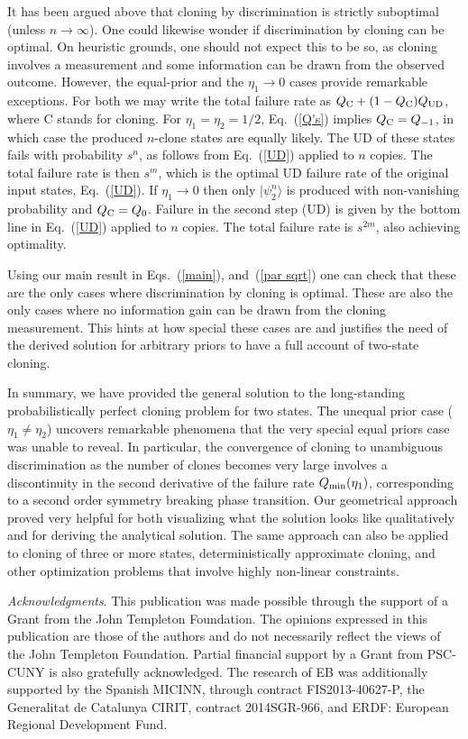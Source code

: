 \documentclass[aps,prl,twocolumn,showpacs]{revtex4}
\begin{document}
It has been argued above that cloning by discrimination is strictly suboptimal (unless $n\to \infty$).
One could likewise wonder if discrimination by cloning can be optimal. On heuristic grounds, one should not expect this to be so, as cloning involves a measurement and some information can be drawn from the observed outcome. However, the equal-prior and the $\eta_1\to 0$ cases provide remarkable exceptions. For both we may write the total failure rate as $Q_{\rm C} + (1-Q_{\rm C})Q_{\rm UD}$, where C stands for cloning. For $\eta_1 = \eta_2= 1/2$, Eq.~(\ref{Q's}) implies $Q_{\rm C}=Q_{-1}$, in which case the produced $n$-clone states are equally likely. The UD of these states fails with probability $s^{n}$, as follows from Eq.~(\ref{UD}) applied to $n$ copies. The total failure rate is then $s^m$, which is the optimal UD failure rate of the original input states, Eq.~(\ref{UD}). If $\eta_1\to 0$ then only $|\psi^n_2\rangle$ is produced with non-vanishing probability and  $Q_{\rm C}=Q_{0}$. Failure in the second step (UD) is given by the bottom line in Eq.~(\ref{UD}) applied to $n$ copies. The total failure rate is $s^{2m}$, also achieving optimality. 

Using our main result in Eqs.~(\ref{main}), and~(\ref{par sqrt}) one can check that these are the only cases where discrimination by cloning is optimal. These are also the only cases where no information gain can be drawn from the cloning measurement.  This hints at how special these cases are and justifies the need of the derived solution for arbitrary priors to have a full account of two-state cloning. 

In summary, we have provided the general solution to the long-standing probabilistically perfect cloning problem for two states. The unequal prior case ($\eta_1\not=\eta_2$) uncovers remarkable phenomena that the very special equal priors case was unable to reveal.  In particular, 
the convergence of cloning to unambiguous discrimination as the number of clones becomes very large involves a discontinuity in the second derivative of the failure rate $Q_{\rm min}(\eta_1)$, corresponding to a second order symmetry breaking phase transition.
Our geometrical approach proved very helpful for both visualizing what the solution looks like qualitatively and for deriving the analytical solution. The same approach can also be applied to cloning of three or more states, deterministically approximate cloning, and other optimization problems that involve highly non-linear constraints.


\begin{acknowledgments}
\emph{Acknowledgments}. This publication was made possible through the support of a Grant from the John Templeton Foundation. The opinions expressed in this publication are those of the authors and do not necessarily reflect the views of the John Templeton Foundation. Partial financial support by a Grant from PSC-CUNY is also gratefully acknowledged. The research of EB was additionally supported by 
the Spanish MICINN, through contract FIS2013-40627-P, the Generalitat de
Catalunya CIRIT, contract  2014SGR-966, and ERDF: European Regional Development Fund.
\end{acknowledgments}
\end{document}
